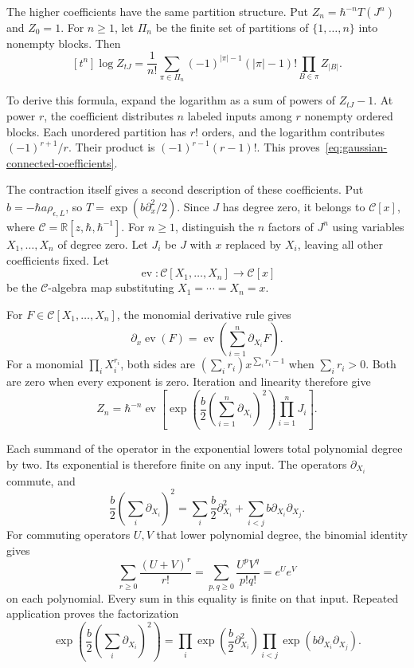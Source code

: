 The higher coefficients have the same partition structure.
Put $Z_n=\hbar^{-n}T(J^n)$ and $Z_0=1$.
For $n\geq1$, let $\Pi_n$ be the finite set of partitions of
$\{1,\ldots,n\}$ into nonempty blocks. Then
\begin{equation}\label{eq:gaussian-connected-coefficients}
 [t^n]\log Z_{tJ}
 =\frac1{n!}\sum_{\pi\in\Pi_n}
       (-1)^{|\pi|-1}(|\pi|-1)!
       \prod_{B\in\pi}Z_{|B|}.
\end{equation}

To derive this formula, expand the logarithm as a sum of powers of
$Z_{tJ}-1$. At power $r$, the coefficient distributes $n$ labeled
inputs among $r$ nonempty ordered blocks.
Each unordered partition has $r!$ orders, and the logarithm contributes
$(-1)^{r+1}/r$. Their product is
$(-1)^{r-1}(r-1)!$.
This proves~\eqref{eq:gaussian-connected-coefficients}.

The contraction itself gives a second description of these coefficients.
Put $b=-\hbar a\rho_{\epsilon,L}$, so $T=\exp(b\partial_x^2/2)$.
Since $J$ has degree zero, it belongs to $\mathcal C[x]$, where
$\mathcal C=\mathbb R[z,\hbar,\hbar^{-1}]$.
For $n\geq1$, distinguish the $n$ factors of $J^n$ using variables
$X_1,\ldots,X_n$ of degree zero.
Let $J_i$ be $J$ with $x$ replaced by $X_i$, leaving all other
coefficients fixed.
Let
\[
 \operatorname{ev}:\mathcal C[X_1,\ldots,X_n]\longrightarrow\mathcal C[x]
\]
be the $\mathcal C$-algebra map substituting $X_1=\cdots=X_n=x$.

For $F\in\mathcal C[X_1,\ldots,X_n]$, the monomial derivative rule gives
\[
 \partial_x\operatorname{ev}(F)
 =\operatorname{ev}\left(\sum_{i=1}^n\partial_{X_i}F\right).
\]
For a monomial $\prod_iX_i^{r_i}$, both sides are
$(\sum_i r_i)x^{\sum_i r_i-1}$ when $\sum_i r_i>0$.
Both are zero when every exponent is zero.
Iteration and linearity therefore give
\begin{equation}\label{eq:gaussian-labeled-contraction}
 Z_n=\hbar^{-n}\operatorname{ev}\left[
  \exp\left(\frac b2\left(\sum_{i=1}^n\partial_{X_i}\right)^2\right)
  \prod_{i=1}^nJ_i\right].
\end{equation}

Each summand of the operator in the exponential lowers total polynomial
degree by two. Its exponential is therefore finite on any input.
The operators $\partial_{X_i}$ commute, and
\[
 \frac b2\left(\sum_i\partial_{X_i}\right)^2
 =\sum_i\frac b2\partial_{X_i}^2
    +\sum_{i<j}b\partial_{X_i}\partial_{X_j}.
\]
For commuting operators $U,V$ that lower polynomial degree,
the binomial identity gives
\[
 \sum_{r\geq0}\frac{(U+V)^r}{r!}
 =\sum_{p,q\geq0}\frac{U^pV^q}{p!q!}
 =e^Ue^V
\]
on each polynomial. Every sum in this equality is finite on that input.
Repeated application proves the factorization
\begin{equation}\label{eq:gaussian-edge-factorization}
 \exp\left(\frac b2\left(\sum_i\partial_{X_i}\right)^2\right)
 =\prod_i\exp\left(\frac b2\partial_{X_i}^2\right)
    \prod_{i<j}\exp\left(b\partial_{X_i}\partial_{X_j}\right).
\end{equation}

